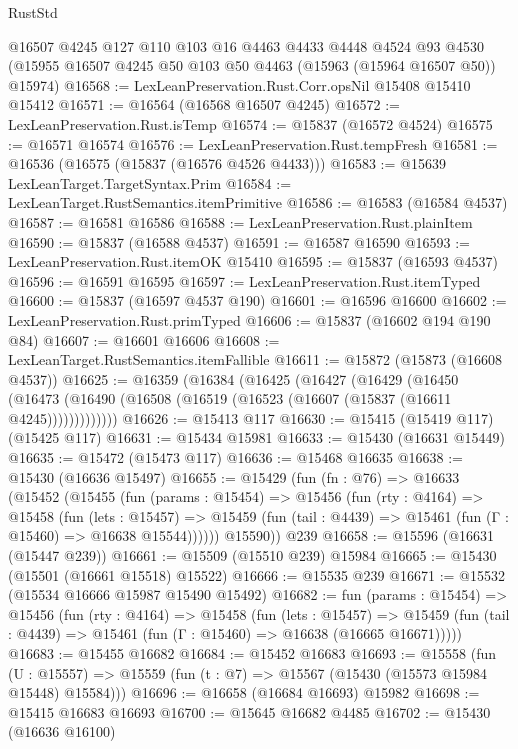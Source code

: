 \begin{lexlean}{RustStd}
\begin{coremodule}
{\begin{coremodule}
{{{{{{{{{{{{{{{{{{{{{{{{{{{{{{{{{{{{{{{{{{{{{{{{{{{{{{{{{{{{    @16507
    @4245
    @127
    @110
    @103
    @16
    @4463
    @4433
    @4448
    @4524
    @93
    @4530
    (@15955 @16507 @4245 @50 @103 @50 @4463 (@15963 (@15964 @16507 @50)) @15974)
@16568 := LexLeanPreservation.Rust.Corr.opsNil @15408 @15410 @15412
@16571 := @16564 (@16568 @16507 @4245)
@16572 := LexLeanPreservation.Rust.isTemp
@16574 := @15837 (@16572 @4524)
@16575 := @16571 @16574
@16576 := LexLeanPreservation.Rust.tempFresh
@16581 := @16536 (@16575 (@15837 (@16576 @4526 @4433)))
@16583 := @15639 LexLeanTarget.TargetSyntax.Prim
@16584 := LexLeanTarget.RustSemantics.itemPrimitive
@16586 := @16583 (@16584 @4537)
@16587 := @16581 @16586
@16588 := LexLeanPreservation.Rust.plainItem
@16590 := @15837 (@16588 @4537)
@16591 := @16587 @16590
@16593 := LexLeanPreservation.Rust.itemOK @15410
@16595 := @15837 (@16593 @4537)
@16596 := @16591 @16595
@16597 := LexLeanPreservation.Rust.itemTyped
@16600 := @15837 (@16597 @4537 @190)
@16601 := @16596 @16600
@16602 := LexLeanPreservation.Rust.primTyped
@16606 := @15837 (@16602 @194 @190 @84)
@16607 := @16601 @16606
@16608 := LexLeanTarget.RustSemantics.itemFallible
@16611 := @15872 (@15873 (@16608 @4537))
@16625 := @16359
    (@16384
      (@16425
        (@16427
          (@16429
            (@16450
              (@16473 (@16490 (@16508 (@16519 (@16523 (@16607 (@15837 (@16611 @4245)))))))))))))
@16626 := @15413 @117
@16630 := @15415 (@15419 @117) (@15425 @117)
@16631 := @15434 @15981
@16633 := @15430 (@16631 @15449)
@16635 := @15472 (@15473 @117)
@16636 := @15468 @16635
@16638 := @15430 (@16636 @15497)
@16655 := @15429
    (fun (fn : @76) =>
    @16633
      (@15452
        (@15455
          (fun (params : @15454) =>
          @15456
            (fun (rty : @4164) =>
            @15458
              (fun (lets : @15457) =>
              @15459 (fun (tail : @4439) => @15461 (fun (Γ : @15460) => @16638 @15544))))))
        @15590))
    @239
@16658 := @15596 (@16631 (@15447 @239))
@16661 := @15509 (@15510 @239) @15984
@16665 := @15430 (@15501 (@16661 @15518) @15522)
@16666 := @15535 @239
@16671 := @15532 (@15534 @16666 @15987 @15490 @15492)
@16682 := fun (params : @15454) =>
  @15456
    (fun (rty : @4164) =>
    @15458
      (fun (lets : @15457) =>
      @15459 (fun (tail : @4439) => @15461 (fun (Γ : @15460) => @16638 (@16665 @16671)))))
@16683 := @15455 @16682
@16684 := @15452 @16683
@16693 := @15558
    (fun (U : @15557) => @15559 (fun (t : @7) => @15567 (@15430 (@15573 @15984 @15448) @15584)))
@16696 := @16658 (@16684 @16693) @15982
@16698 := @15415 @16683 @16693
@16700 := @15645 @16682 @4485
@16702 := @15430 (@16636 @16100)
}}}}}}}}}}}}}}}}}}}}}}}}}}}}}}}}}}}}}}}}}}}}}}}}}}}}}}}}}}}}
\end{coremodule}}
\end{coremodule}
\end{lexlean}
